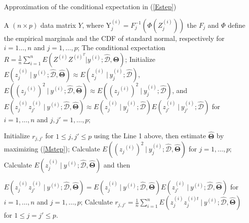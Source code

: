 \begin{algorithm}[!b] 
	\renewcommand{\algorithmicrequire}{\textbf{Input:}}
	\renewcommand{\algorithmicensure}{\textbf{Output:}}
	\caption{ Approximation of the conditional expectation in (\ref{Estep})}
	\label{algorithm:approx}
	\begin{algorithmic}[1]
		\REQUIRE A $(n \times p)$ data matrix $Y$, where Y$^{(i)}_j = F^{-1}_j(\Phi(Z^{(i)}_{j}))$ the $F_j$ and $\Phi$ define the empirical marginals and the CDF of standard normal, respectively for $i = 1 \ldots, n$ and $j = 1, \ldots, p$; 
		\ENSURE The conditional expectation $R = \frac{1}{n} \sum\limits_{i=1}^{n} E( Z^{(i)} Z^{(i)^T} | y^{(i)}; \mathcal{\widehat{D}}, \mathbf{\Theta})$; %
		\STATE Initialize $E(z^{(i)}_{j} \ | \ y^{(i)}; \mathcal{\widehat{D}}, \widehat{ \mathbf{\Theta}}) \approx E(z^{(i)}_{j} \ | \ y^{(i)}_{j}; \mathcal{\widehat{D}} )$, $E( (z_j{^{(i)}})^2 \ | \ y^{(i)}; \mathcal{\widehat{D}}, \widehat{ \mathbf{\Theta}}) \approx E( (z_j{^{(i)}})^2 \ | \ y^{(i)}_j; \mathcal{\widehat{D}} )$, and  $E(z^{(i)}_{j} z^{(i)}_{j'} \ | \ y^{(i)}; \mathcal{\widehat{D}}, \widehat{ \mathbf{\Theta}}) \approx  E(z^{(i)}_{j} \ | \ y^{(i)}_{j}; \mathcal{\widehat{D}})  E(z^{(i)}_{j'} \ | \ y^{(i)}_{j'}; \mathcal{\widehat{D}} )$ for $i = 1,\ldots, n$ and $j,j' = 1, \ldots, p$;
		
		\STATE Initialize $r_{j,j'}$ for $1 \leq j, j' \leq p$ using the Line 1 above, then estimate $\widehat{ \mathbf{\Theta}}$ by maximizing (\ref{Mstep});
		\STATE Calculate $E((z_j{^{(i)}})^2 \ | \ y^{(i)}_j; \mathcal{\widehat{D}}, \widehat{ \mathbf{\Theta}} )$  for $j = 1, \ldots, p$; %
		\ELSE
		\STATE Calculate $E(z^{(i)}_{j} \ | \ y^{(i)}; \mathcal{\widehat{D}}, \widehat{ \mathbf{\Theta}})$  and then %
		
		$E(z^{(i)}_{j} z^{(i)}_{j'} \ | \ y^{(i)}; \mathcal{\widehat{D}}, \widehat{ \mathbf{\Theta}}) =  E(z^{(i)}_{j} \ | \ y^{(i)}; \mathcal{\widehat{D}}, \widehat{ \mathbf{\Theta}})  E(z^{(i)}_{j'} \ | \ y^{(i)}; \mathcal{\widehat{D}}, \widehat{ \mathbf{\Theta}} )$ for $i = 1,\ldots, n$ and $j = 1, \ldots, p$;
		\ENDIF
		\ENDFOR
		\STATE Calculate $r_{j,j'}= \frac{1}{n} \sum_{i=1}^{n} E(z_j^{(i)} z_j^{(i)t} \ | \ y^{(i)}; \mathbf{\widehat{\mathcal{D}}}, \widehat{ \mathbf{\Theta}} )$ for $ 1 \le j = j' \le p$.
	\end{algorithmic}
\end{algorithm}

